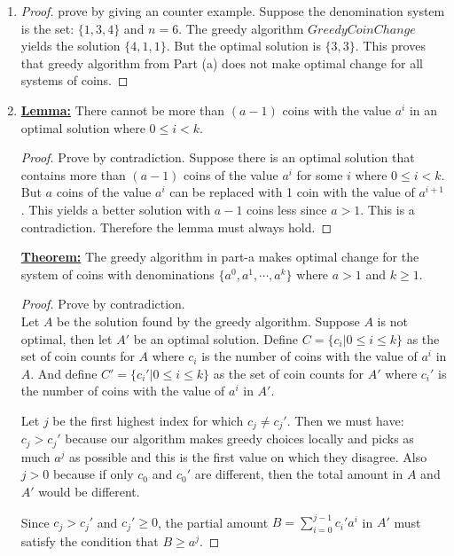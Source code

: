 \documentclass[11pt]{article}
\begin{document}
\begin{enumerate}
\begin{enumerate}
\item %
  \begin{proof}
    prove by giving an counter example. Suppose the denomination system
    is the set: $\{1,3,4\}$ and $n=6$. The greedy algorithm
    $GreedyCoinChange$ yields the solution $\{4,1,1\}$. But the optimal
    solution is $\{3,3\}$. This proves that greedy algorithm from Part
    (a) does not make optimal change for all systems of coins.
  \end{proof}

\item %
  \underline{\textbf{Lemma:}} There cannot be more than $(a-1)$
  coins with the value $a^i$ in an optimal solution where $0
  \leq i < k$.

  \begin{proof}
    Prove by contradiction. Suppose there is an optimal solution that
    contains more than $(a-1)$ coins of the value $a^i$ for
    some $i$ where $0 \leq i < k$. But $a$ coins of the value $a^i$
    can be replaced with 1 coin with the value of $a^{i+1}$. This
    yields a better solution with $a-1$ coins less since $a > 1$. This
    is a contradiction. Therefore the lemma must always hold.
  \end{proof}

  \underline{\textbf{Theorem:}} The greedy algorithm in part-a makes optimal
  change for the system of coins with denominations
  $\{a^0,a^1,\cdots,a^k\}$ where $a>1$ and $k \geq 1$.

  \begin{proof}
    Prove by contradiction.\\
    Let $A$ be the solution found by the greedy
    algorithm. Suppose $A$ is not optimal, then let $A'$ be an
    optimal solution. Define $C = \{c_i | 0 \leq i \leq k\}$ as the set
    of coin counts for $A$ where $c_i$ is the number of coins with the
    value of $a^i$ in $A$. And define $C' = \{c_i' | 0 \leq i \leq k\}$ as the set
    of coin counts for $A'$ where $c_i'$ is the number of coins with the
    value of $a^i$ in $A'$. 

    Let $j$ be the first highest index for which $c_j \neq c_j'$. Then
    we must have: $c_j > c_j'$ because our algorithm makes greedy
    choices locally and picks as much $a^j$ as possible and this is
    the first value on which they disagree. Also $j > 0$ because if
    only $c_0$ and $c_0'$ are different, then the total amount in $A$
    and $A'$ would be different. 

    Since $c_j > c_j'$ and $c_j' \geq 0$, the partial amount
    $B=\sum_{i=0}^{j-1} c_i' a^i$ in $A'$ must satisfy the condition
    that $B \geq a^j$.


\end{proof}
\end{enumerate}
\end{enumerate}
\end{document}
